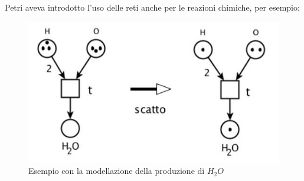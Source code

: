 \documentclass[a4paper,12pt, oneside]{book}
\begin{document}
\newpage
\begin{esempio}
  Petri aveva introdotto l'uso delle reti anche per le reazioni chimiche, per
  esempio:
  \begin{figure}[H]
    \centering
    \includegraphics[scale = 0.35]{img/pt9.jpg}
    \caption{Esempio con la modellazione della produzione di $H_2O$}
  \end{figure}
\end{esempio}
\end{document}

